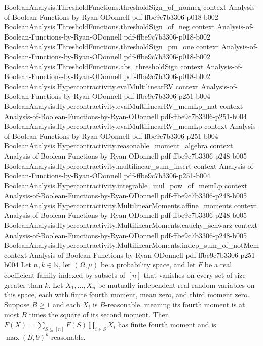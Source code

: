 \begin{theorem}
\proofstep
  {BooleanAnalysis.ThresholdFunctions.thresholdSign_of_nonneg}
  {context}
  {Analysis-of-Boolean-Functions-by-Ryan-ODonnell}
  {pdf-ffbe9c7b3306-p018-b002}
\proofstep
  {BooleanAnalysis.ThresholdFunctions.thresholdSign_of_neg}
  {context}
  {Analysis-of-Boolean-Functions-by-Ryan-ODonnell}
  {pdf-ffbe9c7b3306-p018-b002}
\proofstep
  {BooleanAnalysis.ThresholdFunctions.thresholdSign_pm_one}
  {context}
  {Analysis-of-Boolean-Functions-by-Ryan-ODonnell}
  {pdf-ffbe9c7b3306-p018-b002}
\proofstep
  {BooleanAnalysis.ThresholdFunctions.abs_thresholdSign}
  {context}
  {Analysis-of-Boolean-Functions-by-Ryan-ODonnell}
  {pdf-ffbe9c7b3306-p018-b002}
\proofstep
  {BooleanAnalysis.Hypercontractivity.evalMultilinearRV}
  {context}
  {Analysis-of-Boolean-Functions-by-Ryan-ODonnell}
  {pdf-ffbe9c7b3306-p251-b004}
\proofstep
  {BooleanAnalysis.Hypercontractivity.evalMultilinearRV_memLp_nat}
  {context}
  {Analysis-of-Boolean-Functions-by-Ryan-ODonnell}
  {pdf-ffbe9c7b3306-p251-b004}
\proofstep
  {BooleanAnalysis.Hypercontractivity.evalMultilinearRV_memLp}
  {context}
  {Analysis-of-Boolean-Functions-by-Ryan-ODonnell}
  {pdf-ffbe9c7b3306-p251-b004}
\proofstep
  {BooleanAnalysis.Hypercontractivity.reasonable_moment_algebra}
  {context}
  {Analysis-of-Boolean-Functions-by-Ryan-ODonnell}
  {pdf-ffbe9c7b3306-p248-b005}
\proofstep
  {BooleanAnalysis.Hypercontractivity.multilinear_sum_insert}
  {context}
  {Analysis-of-Boolean-Functions-by-Ryan-ODonnell}
  {pdf-ffbe9c7b3306-p251-b004}
\proofstep
  {BooleanAnalysis.Hypercontractivity.integrable_mul_pow_of_memLp}
  {context}
  {Analysis-of-Boolean-Functions-by-Ryan-ODonnell}
  {pdf-ffbe9c7b3306-p248-b005}
\proofstep
  {BooleanAnalysis.Hypercontractivity.MultilinearMoments.affine_moments}
  {context}
  {Analysis-of-Boolean-Functions-by-Ryan-ODonnell}
  {pdf-ffbe9c7b3306-p248-b005}
\proofstep
  {BooleanAnalysis.Hypercontractivity.MultilinearMoments.cauchy_schwarz}
  {context}
  {Analysis-of-Boolean-Functions-by-Ryan-ODonnell}
  {pdf-ffbe9c7b3306-p248-b005}
\proofstep
  {BooleanAnalysis.Hypercontractivity.MultilinearMoments.indep_sum_of_notMem}
  {context}
  {Analysis-of-Boolean-Functions-by-Ryan-ODonnell}
  {pdf-ffbe9c7b3306-p251-b004}
Let $n,k\in\mathbb N$, let $(\Omega,\mu)$ be a probability space, and let $F$ be a real
coefficient family indexed by subsets of $[n]$ that vanishes on every set of size
greater than $k$. Let $X_1,\ldots,X_n$ be mutually independent real random variables on
this space, each with finite fourth moment, mean zero, and third moment zero. Suppose
$B\ge1$ and each $X_i$ is $B$-reasonable, meaning its fourth moment is at most $B$ times
the square of its second moment. Then $F(X)=\sum_{S\subseteq[n]}F(S)\prod_{i\in S}X_i$
has finite fourth moment and is $\max(B,9)^k$-reasonable.
\end{theorem}
